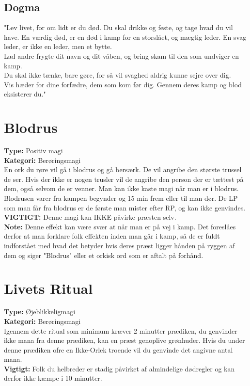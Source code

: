 \subsection{Dogma}
"Lev livet, for om lidt er du død. Du skal drikke og feste, og tage hvad du vil have. En værdig død, er en død i kamp for en storslået, og mægtig leder. En svag leder, er ikke en leder, men et bytte.\\
Lad andre frygte dit navn og dit våben, og bring skam til den som undviger en kamp.\\
Du skal ikke tænke, bare gøre, for så vil svaghed aldrig kunne sejre over dig.\\
Vis hæder for dine forfædre, dem som kom før dig. Gennem deres kamp og blod eksisterer du."

\section{Blodrus}
\textbf{Type:} Positiv magi\\
\textbf{Kategori:} Berøringsmagi\\
En ork du røre vil gå i blodrus og gå bersærk. De vil angribe den største trussel de ser. Hvis der ikke er nogen trusler vil de angribe den person der er tættest på dem, også selvom de er venner. Man kan ikke kaste magi når man er i blodrus.
Blodrusen varer fra kampen begynder og 15 min frem eller til man dør. De LP som man får fra blodrus er de første man mister efter RP, og kan ikke genvindes.\\
\textbf{VIGTIGT:} Denne magi kan IKKE påvirke præsten selv.\\
\textbf{Note:} Denne effekt kan være svær at når man er på vej i kamp. Det foreslåes derfor at man forklare folk effekten inden man går i kamp, så de er fuldt indforstået med hvad det betyder hvis deres præst ligger hånden på ryggen af dem og siger "Blodrus" eller et orkisk ord som er aftalt på forhånd.

\section{Livets Ritual}
\textbf{Type:} Øjeblikkeligmagi\\ 
\textbf{Kategori:} Berøringsmagi\\
Igennem dette ritual som minimum kræver 2 minutter prædiken, du genvinder ikke mana fra denne prædiken, kan en præst genoplive grønhuder. Hvis du under denne prædiken ofre en Ikke-Orlek troende vil du genvinde det angivne antal mana.\\
\textbf{Vigtigt:} Folk du helbreder er stadig påvirket af almindelige dødregler og kan derfor ikke kæmpe i 10 minutter.

